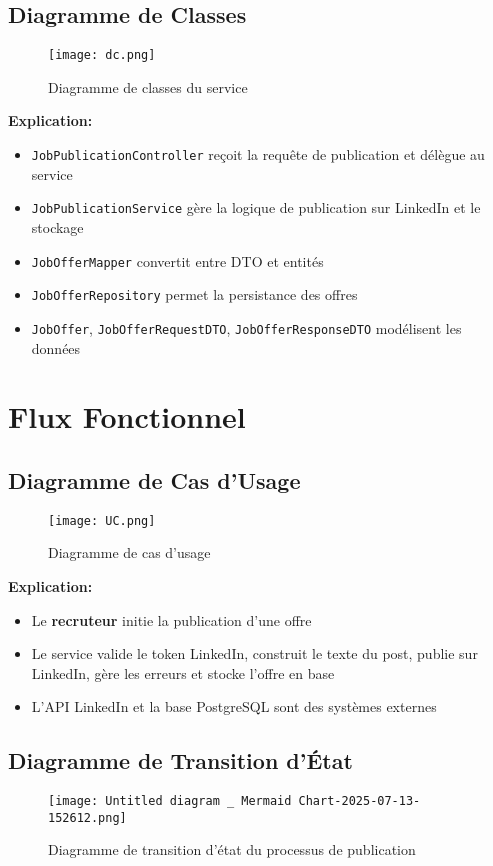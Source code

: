\documentclass[a4paper,12pt]{report}
\begin{document}
\section{Diagramme de Classes}
\begin{figure}[H]
    \centering
    \texttt{[image: dc.png]}
    \caption{Diagramme de classes du service}
    \label{fig:class_diagram}
\end{figure}

\textbf{Explication:}
\begin{itemize}[leftmargin=*]
    \item \texttt{JobPublicationController} reçoit la requête de publication et délègue au service
    \item \texttt{JobPublicationService} gère la logique de publication sur LinkedIn et le stockage
    \item \texttt{JobOfferMapper} convertit entre DTO et entités
    \item \texttt{JobOfferRepository} permet la persistance des offres
    \item \texttt{JobOffer}, \texttt{JobOfferRequestDTO}, \texttt{JobOfferResponseDTO} modélisent les données
\end{itemize}

\chapter{Flux Fonctionnel}
\section{Diagramme de Cas d'Usage}
\begin{figure}[H]
    \centering
    \texttt{[image: UC.png]}
    \caption{Diagramme de cas d'usage}
    \label{fig:use_case}
\end{figure}

\textbf{Explication:}
\begin{itemize}[leftmargin=*]
    \item Le \textbf{recruteur} initie la publication d'une offre
    \item Le service valide le token LinkedIn, construit le texte du post, publie sur LinkedIn, gère les erreurs et stocke l'offre en base
    \item L'API LinkedIn et la base PostgreSQL sont des systèmes externes
\end{itemize}

\section{Diagramme de Transition d'État}
\begin{figure}[H]
    \centering
    \texttt{[image: Untitled diagram \_ Mermaid Chart-2025-07-13-152612.png]}
    \caption{Diagramme de transition d'état du processus de publication}
    \label{fig:state_diagram}
\end{figure}
\end{document}
